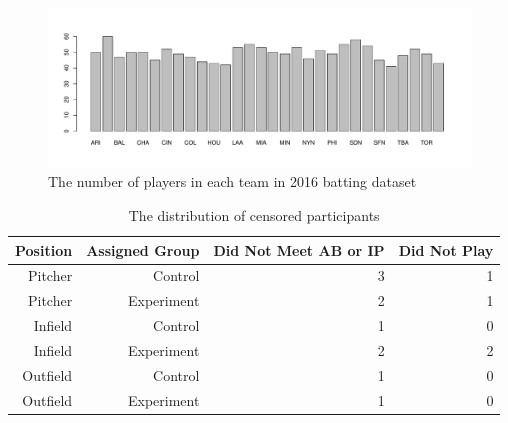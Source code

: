 \begin{figure}[tbp]
  \centering
  \includegraphics[width=\textwidth]{baseball team.pdf}
  \caption{The number of players in each team in 2016 batting dataset}
  \label{fig:team}
\end{figure}


\begin{table}[tbp]
  \caption{The distribution of censored participants}
  \label{tab:rv}
\centering
\begin{tabular}{rrrr}
  \toprule
  Position & Assigned Group & Did Not Meet AB or IP & Did Not Play\\ 
  \midrule
Pitcher & Control & 3 & 1\\
Pitcher & Experiment & 2 & 1\\
Infield & Control & 1 & 0 \\
Infield & Experiment & 2 & 2\\
Outfield & Control & 1 & 0\\
Outfield & Experiment & 1 & 0\\
  \bottomrule
\end{tabular}
\end{table}